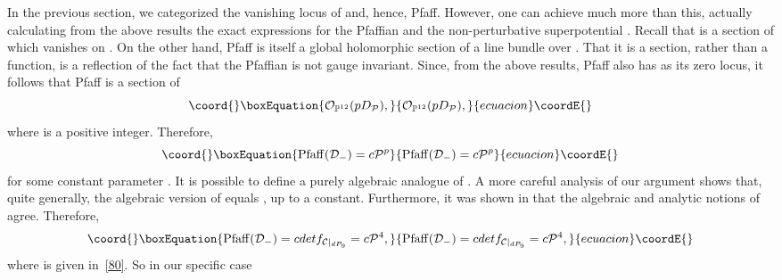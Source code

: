 \documentclass[a4paper,12pt]{article}
\numberwithin{equation}{section}
\theoremstyle{plain}
\begin{document}
In the previous section, we categorized the vanishing locus of \coordHE{}
and,
hence, Pfaff\coordHE{}. However, one can achieve much more than
this,
actually calculating from the above results the exact expressions for the
Pfaffian and the non-perturbative superpotential \coordHE{}. Recall that
\coordHE{} is a section of \coordHE{}
which vanishes on \coordHE{}.
On the other hand, Pfaff\coordHE{} is itself a
global holomorphic section of a line bundle over \coordHE{}. That
it is a section, rather than a function, is a reflection of the fact that
the Pfaffian is not gauge invariant. Since, from the above results,
Pfaff\coordHE{} also has \coordHE{} as its zero locus, it
follows
that Pfaff\coordHE{} is a section of
%
\begin{equation}\coord{}\boxEquation{
{\cal O}_{{\mathbb P}^{12}}(pD_{{\cal{P}}}),
\label{83}
}{
{\cal O}_{{\mathbb P}^{12}}(pD_{{\cal{P}}}),
}{ecuacion}\coordE{}\end{equation}
%
where \coordHE{} is a positive integer. Therefore,
%
\begin{equation}\coord{}\boxEquation{
{\rm Pfaff}({\cal{D}}_{-})=c{\cal{P}}^{p}
\label{83a}
}{
{\rm Pfaff}({\cal{D}}_{-})=c{\cal{P}}^{p}
}{ecuacion}\coordE{}\end{equation}
%
for some constant parameter \coordHE{}. 
It is possible to define a purely algebraic analogue of
\coordHE{}. A more careful analysis of our argument shows
that, quite generally, the algebraic version of
\coordHE{} equals 
\coordHE{}, up to a constant. Furthermore, it was shown
in \cite{Bismut1,Bismut2,Bismut3} that the algebraic and analytic notions 
of \coordHE{} agree. Therefore,
%
\begin{equation}\coord{}\boxEquation{
{\rm Pfaff}({\cal{D}}_{-})=cdetf_{{\cal{C}}|_{dP_{9}}}=
c{\cal{P}}^{4},
\label{83.b}
}{
{\rm Pfaff}({\cal{D}}_{-})=cdetf_{{\cal{C}}|_{dP_{9}}}=
c{\cal{P}}^{4},
}{ecuacion}\coordE{}\end{equation}
%
where \coordHE{} is given in~\eqref{80}. So in our specific case 
\end{document}
